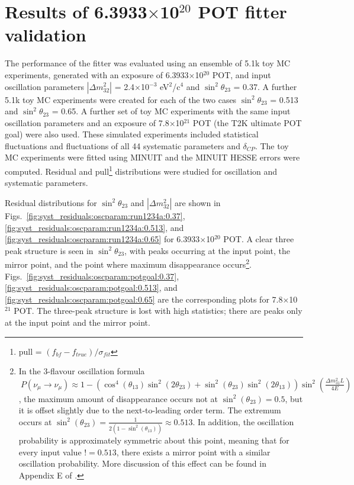 \clearpage

\section {Results of 6.3933$\times$10$^{20}$ POT fitter validation}%
\label{sec:sensitivity}

The performance of the fitter was evaluated using an ensemble of 5.1k toy MC experiments,
generated
with an exposure of 6.3933$\times$10$^{20}$ POT,
and input oscillation parameters
$|\Delta m^{2}_{32}|$ = 2.4$\times$10$^{-3}$ eV$^{2}$/c$^{4}$
and $\sin^{2}\theta_{23}$ = 0.37. A further 5.1k toy MC experiments were
created for each of the two cases $\sin^{2}\theta_{23}$ = 0.513 and $\sin^{2}\theta_{23}$ = 0.65.
A further set of toy MC experiments with the same input oscillation parameters and an exposure of
7.8$\times$10$^{21}$ POT (the T2K ultimate POT goal) were also used.
These simulated experiments included statistical fluctuations and
fluctuations of all 44 systematic parameters
and $\delta_{CP}$.
The toy MC experiments were fitted using MINUIT and the MINUIT HESSE errors were computed.
Residual and pull\footnote{pull = $(f_{bf} - f_{true}) / \sigma_{fit}$}
distributions were studied for oscillation and systematic parameters.

Residual distributions for $\sin^{2}\theta_{23}$ and $|\Delta m^{2}_{32}|$ are shown in
Figs.\ \ref{fig:syst_residuals:oscparam:run1234a:0.37}, \ref{fig:syst_residuals:oscparam:run1234a:0.513}, and \ref{fig:syst_residuals:oscparam:run1234a:0.65}
for 6.3933$\times$10$^{20}$ POT.
A clear three peak structure is seen in $\sin^{2}\theta_{23}$, with peaks occurring at
the input point, the mirror point, and the point where maximum disappearance occurs\footnote{
  In the 3-flavour oscillation formula\footnotemark
  $\:P(\nu_{\mu}\rightarrow\nu_{\mu})
  \approx 1 - \left( \cos^4(\theta_{13})\sin^{2}(2\theta_{23}) + \sin^{2}(\theta_{23})\sin^{2}(2\theta_{13}) \right) \sin^{2}\left(\frac{\Delta m_{31}^{2} L}{4E}\right)$,
  the maximum amount of disappearance occurs not at $\sin^{2}(\theta_{23}) = 0.5$, but it is offset slightly due to the next-to-leading order term.
  The extremum occurs at $\sin^{2}(\theta_{23})= \frac{1}{2(1-\sin^{2}(\theta_{13}))} \approx 0.513$.
  In addition, the oscillation probability is approximately symmetric about this point, meaning that for every input value $!= 0.513$, there exists
  a mirror point with a similar oscillation probability.
  More discussion of this effect can be found in Appendix E of \cite{OurRun123JointOscillationAnalysis}.
}.
Figs.\ \ref{fig:syst_residuals:oscparam:potgoal:0.37}, \ref{fig:syst_residuals:oscparam:potgoal:0.513}, and \ref{fig:syst_residuals:oscparam:potgoal:0.65}
are the corresponding plots for 7.8$\times$10$^{21}$ POT.
The three-peak structure is lost with high statistics;
there are peaks only at the input point and the mirror point.

